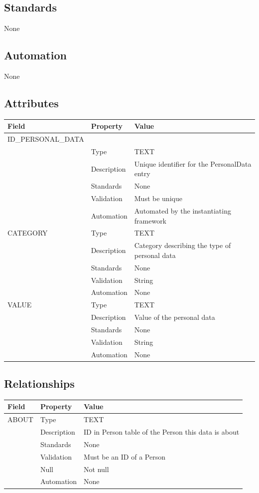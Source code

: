 \subsection{Standards}\label{standards-23}

None

\subsection{Automation}\label{automation-23}

None

\subsection{Attributes}\label{attributes-20}

\begin{longtable}[]{@{}lll@{}}
\toprule\noalign{}
Field & Property & Value \\
\midrule\noalign{}
\endhead
\bottomrule\noalign{}
\endlastfoot
ID\_PERSONAL\_DATA & & \\
& Type & TEXT \\
& Description & Unique identifier for the PersonalData entry \\
& Standards & None \\
& Validation & Must be unique \\
& Automation & Automated by the instantiating framework \\
CATEGORY & Type & TEXT \\
& Description & Category describing the type of personal data \\
& Standards & None \\
& Validation & String \\
& Automation & None \\
VALUE & Type & TEXT \\
& Description & Value of the personal data \\
& Standards & None \\
& Validation & String \\
& Automation & None \\
\end{longtable}

\subsection{Relationships}\label{relationships-18}

\begin{longtable}[]{@{}lll@{}}
\toprule\noalign{}
Field & Property & Value \\
\midrule\noalign{}
\endhead
\bottomrule\noalign{}
\endlastfoot
ABOUT & Type & TEXT \\
& Description & ID in Person table of the Person this data is about \\
& Standards & None \\
& Validation & Must be an ID of a Person \\
& Null & Not null \\
& Automation & None \\
\end{longtable}


